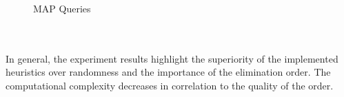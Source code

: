 \intextsep
\begin{figure}[H]%
    \centering
    \qquad
    \qquad
    \qquad
    \caption{MAP Queries }%
    \label{fig:map_histograms}%
\end{figure}
\\\\
In general, the experiment results highlight the superiority of the implemented heuristics over randomness and the importance of the elimination order. The computational complexity decreases in correlation to the quality of the order. 
